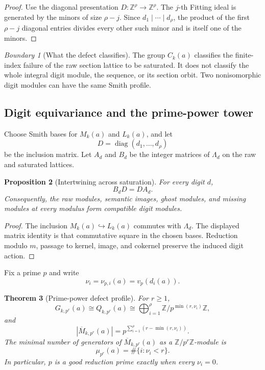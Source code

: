 \documentclass[11pt]{article}
\newtheorem{theorem}{Theorem}[section]
\newtheorem{proposition}[theorem]{Proposition}
\theoremstyle{definition}
\theoremstyle{remark}
\newtheorem{boundary}[theorem]{Boundary}
\begin{document}
\begin{proof}
Use the diagonal presentation \(D:\mathbb Z^\rho\to\mathbb Z^\rho\).  The \(j\)-th Fitting ideal is generated by the minors of size \(\rho-j\).  Since \(d_1\mid\cdots\mid d_\rho\), the product of the first \(\rho-j\) diagonal entries divides every other such minor and is itself one of the minors.
\end{proof}

\begin{boundary}[What the defect classifies]
\label{bnd:block06-defect-boundary}
The group \(C_k(a)\) classifies the finite-index failure of the raw section lattice to be saturated.  It does not classify the whole integral digit module, the sequence, or its section orbit.  Two nonisomorphic digit modules can have the same Smith profile.
\end{boundary}

\subsection{Digit equivariance and the prime-power tower}

Choose Smith bases for \(M_k(a)\) and \(L_k(a)\), and let
\[
D=\operatorname{diag}(d_1,\ldots,d_\rho)
\]
be the inclusion matrix.  Let \(A_d\) and \(B_d\) be the integer matrices of \(\Lambda_d\) on the raw and saturated lattices.

\begin{proposition}[Intertwining across saturation]
\label{prop:block06-intertwining}
For every digit \(d\),
\[
B_dD=DA_d.
\]
Consequently, the raw modules, semantic images, ghost modules, and missing modules at every modulus form compatible digit modules.
\end{proposition}

\begin{proof}
The inclusion \(M_k(a)\hookrightarrow L_k(a)\) commutes with \(\Lambda_d\).  The displayed matrix identity is that commutative square in the chosen bases.  Reduction modulo \(m\), passage to kernel, image, and cokernel preserve the induced digit action.
\end{proof}

Fix a prime \(p\) and write
\[
\nu_i=\nu_{p,i}(a)=v_p(d_i(a)).
\]

\begin{theorem}[Prime-power defect profile]
\label{thm:block06-prime-power-profile}
For \(r\geq1\),
\[
G_{k,p^r}(a)
\cong
Q_{k,p^r}(a)
\cong
\bigoplus_{i=1}^{\rho}
\mathbb Z/p^{\min(r,\nu_i)}\mathbb Z,
\]
and
\[
\left|\overline M_{k,p^r}(a)\right|
=
p^{\sum_{i=1}^{\rho}(r-\min(r,\nu_i))}.
\]
The minimal number of generators of \(\overline M_{k,p^r}(a)\) as a \(\mathbb Z/p^r\mathbb Z\)-module is
\[
\mu_{p^r}(a)
=
\#\{i:\nu_i<r\}.
\]
In particular, \(p\) is a good reduction prime exactly when every \(\nu_i=0\).
\end{theorem}
\end{document}
